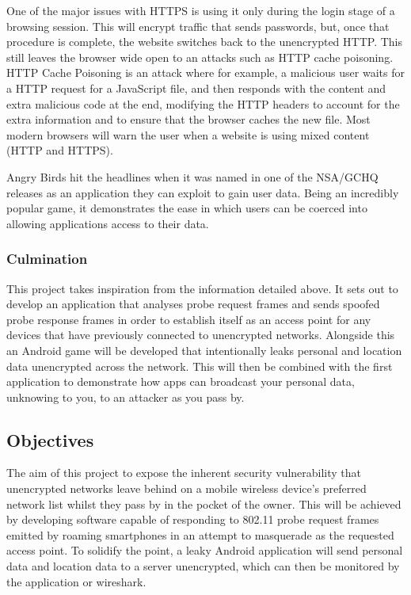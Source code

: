 One of the major issues with HTTPS is using it only during the login stage of a browsing session. This will encrypt traffic that sends passwords, but, once that procedure is complete, the website switches back to the unencrypted HTTP. This still leaves the browser wide open to an attacks such as HTTP cache poisoning. HTTP Cache Poisoning is an attack where for example, a malicious user waits for a HTTP request for a JavaScript file, and then responds with the content and extra malicious code at the end, modifying the HTTP headers to account for the extra information and to ensure that the browser caches the new file. Most modern browsers will warn the user when a website is using mixed content (HTTP and HTTPS).

Angry Birds hit the headlines when it was named in one of the NSA/GCHQ releases \cite{intro:angry_leak} as an application they can exploit to gain user data. Being an incredibly popular game, it demonstrates the ease in which users can be coerced into allowing applications access to their data.
\newpage
\subsubsection{Culmination}

This project takes inspiration from the information detailed above. It sets out to develop an application that analyses probe request frames and sends spoofed probe response frames in order to establish itself as an access point for any devices that have previously connected to unencrypted networks. Alongside this an Android game will be developed that intentionally leaks personal and location data unencrypted across the network. This will then be combined with the first application to demonstrate how apps can broadcast your personal data, unknowing to you, to an attacker as you pass by.

\subsection{Objectives}
The aim of this project to expose the inherent security vulnerability that unencrypted networks leave behind on a mobile wireless device's preferred network list whilst they pass by in the pocket of the owner. This will be achieved by developing software capable of responding to 802.11 probe request frames emitted by roaming smartphones in an attempt to masquerade as the requested access point. To solidify the point, a leaky Android application will send personal data and location data to a server unencrypted, which can then be monitored by the application or wireshark.

